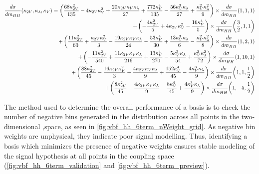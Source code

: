     {\footnotesize \begin{equation}
    \label{eqn:vbf_hh_6term_chosen}
    \begin{split}
        \frac{d\sigma}{dm_{HH}}(\kappa_{2V}, \kappa_{\lambda}, \kappa_{V}) =
            \left(\frac{68 \kappa_{2V}^{2}}{135} - 4 \kappa_{2V} \kappa_{V}^{2} + \frac{20 \kappa_{2V} \kappa_{V} \kappa_{\lambda}}{27} + \frac{772 \kappa_{V}^{4}}{135} - \frac{56 \kappa_{V}^{3} \kappa_{\lambda}}{27} + \frac{\kappa_{V}^{2} \kappa_{\lambda}^{2}}{9}\right) \times \frac{d\sigma}{dm_{HH}}{\left(1,1,1 \right)} \\
            + \left(- \frac{4 \kappa_{2V}^{2}}{5} + 4 \kappa_{2V} \kappa_{V}^{2} - \frac{16 \kappa_{V}^{4}}{5}\right) \times \frac{d\sigma}{dm_{HH}}{\left(\frac{3}{2},1,1 \right)} \\
            + \left(\frac{11 \kappa_{2V}^{2}}{60} + \frac{\kappa_{2V} \kappa_{V}^{2}}{3} - \frac{19 \kappa_{2V} \kappa_{V} \kappa_{\lambda}}{24} - \frac{53 \kappa_{V}^{4}}{30} + \frac{13 \kappa_{V}^{3} \kappa_{\lambda}}{6} - \frac{\kappa_{V}^{2} \kappa_{\lambda}^{2}}{8}\right) \times \frac{d\sigma}{dm_{HH}}{\left(1,2,1 \right)} \\
            + \left(- \frac{11 \kappa_{2V}^{2}}{540} + \frac{11 \kappa_{2V} \kappa_{V} \kappa_{\lambda}}{216} + \frac{13 \kappa_{V}^{4}}{270} - \frac{5 \kappa_{V}^{3} \kappa_{\lambda}}{54} + \frac{\kappa_{V}^{2} \kappa_{\lambda}^{2}}{72}\right) \times \frac{d\sigma}{dm_{HH}}{\left(1,10,1 \right)}  \\
            + \left(\frac{88 \kappa_{2V}^{2}}{45} - \frac{16 \kappa_{2V} \kappa_{V}^{2}}{3} + \frac{4 \kappa_{2V} \kappa_{V} \kappa_{\lambda}}{9} + \frac{152 \kappa_{V}^{4}}{45} - \frac{4 \kappa_{V}^{3} \kappa_{\lambda}}{9}\right) \times \frac{d\sigma}{dm_{HH}}{\left(1,1,\frac{1}{2} \right)} \\
            + \left(\frac{8 \kappa_{2V}^{2}}{45} - \frac{4 \kappa_{2V} \kappa_{V} \kappa_{\lambda}}{9} - \frac{8 \kappa_{V}^{4}}{45} + \frac{4 \kappa_{V}^{3} \kappa_{\lambda}}{9}\right) \times \frac{d\sigma}{dm_{HH}}{\left(1,-5,\frac{1}{2} \right)}
    \end{split}
    \end{equation}}

    The method used to determine the overall performance of a basis is to check the number of negative bins generated
        in the \mhh distribution across all points in the two-dimensional \kvv,\kl space, as seen in \ref{fig:vbf_hh_6term_nWeight_grid}.
    As negative bin weights are unphysical, they indicate poor signal modelling.
    Thus, identifying a basis which minimizes the presence of negative weights ensures stable modeling of the signal hypothesis at all points in the coupling space (\ref{fig:vbf_hh_6term_validation} and \ref{fig:vbf_hh_6term_preview}).

